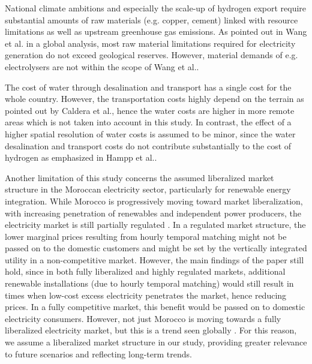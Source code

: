\documentclass[5p,numafflabel]{elsarticle}
\begin{document}
National climate ambitions and especially the scale-up of hydrogen export require substantial amounts of raw materials (e.g. copper, cement) linked with resource limitations as well as upstream greenhouse gas emissions. As pointed out in Wang et al.\cite{Wang2023} in a global analysis, most raw material limitations required for electricity generation do not exceed geological reserves. However, material demands of e.g. electrolysers are not within the scope of Wang et al.\cite{Wang2023}.

The cost of water through desalination and transport has a single cost for the whole country. However, the transportation costs highly depend on the terrain as pointed out by Caldera et al.\cite{Caldera2016}, hence the water costs are higher in more remote areas which is not taken into account in this study. In contrast, the effect of a higher spatial resolution of water costs is assumed to be minor, since the water desalination and transport costs do not contribute substantially to the cost of hydrogen as emphasized in Hampp et al.\cite{Hampp2023}.

Another limitation of this study concerns the assumed liberalized market structure in the Moroccan electricity sector, particularly for renewable energy integration. While Morocco is progressively moving toward market liberalization, with increasing penetration of renewables and independent power producers, the electricity market is still partially regulated \cite{Bentaibi2021}. In a regulated market structure, the lower marginal prices resulting from hourly temporal matching might not be passed on to the domestic customers and might be set by the vertically integrated utility in a non-competitive market. However, the main findings of the paper still hold, since in both fully liberalized and highly regulated markets, additional renewable installations (due to hourly temporal matching) would still result in times when low-cost excess electricity penetrates the market, hence reducing prices. In a fully competitive market, this benefit would be passed on to domestic electricity consumers. 
However, not just Morocco is moving towards a fully liberalized electricity market, but this is a trend seen globally \cite{Fatras2022, Faia2024, Xu2020, Fattouh2021}. For this reason, we assume a liberalized market structure in our study, providing greater relevance to future scenarios and reflecting long-term trends.
\end{document}
